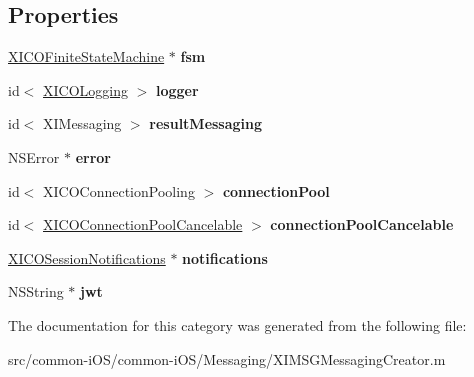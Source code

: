 \subsection*{Properties}
\begin{DoxyCompactItemize}
\item 
\hypertarget{category_x_i_m_s_g_messaging_creator_07_08_a4822405109783f0e28932d21c18ee185}{}\label{category_x_i_m_s_g_messaging_creator_07_08_a4822405109783f0e28932d21c18ee185} 
\hyperlink{class_x_i_c_o_finite_state_machine}{X\+I\+C\+O\+Finite\+State\+Machine} $\ast$ {\bfseries fsm}
\item 
\hypertarget{category_x_i_m_s_g_messaging_creator_07_08_a9dc70f2bf70103916fff0ee287ad2edd}{}\label{category_x_i_m_s_g_messaging_creator_07_08_a9dc70f2bf70103916fff0ee287ad2edd} 
id$<$ \hyperlink{protocol_x_i_c_o_logging-p}{X\+I\+C\+O\+Logging} $>$ {\bfseries logger}
\item 
\hypertarget{category_x_i_m_s_g_messaging_creator_07_08_ac73632d6f07601011cce1692beb5a6d1}{}\label{category_x_i_m_s_g_messaging_creator_07_08_ac73632d6f07601011cce1692beb5a6d1} 
id$<$ X\+I\+Messaging $>$ {\bfseries result\+Messaging}
\item 
\hypertarget{category_x_i_m_s_g_messaging_creator_07_08_a19e76d1c4090ab404813787accb19de1}{}\label{category_x_i_m_s_g_messaging_creator_07_08_a19e76d1c4090ab404813787accb19de1} 
N\+S\+Error $\ast$ {\bfseries error}
\item 
\hypertarget{category_x_i_m_s_g_messaging_creator_07_08_a0ae029b51a1b5fcadb40542837e79c5d}{}\label{category_x_i_m_s_g_messaging_creator_07_08_a0ae029b51a1b5fcadb40542837e79c5d} 
id$<$ X\+I\+C\+O\+Connection\+Pooling $>$ {\bfseries connection\+Pool}
\item 
\hypertarget{category_x_i_m_s_g_messaging_creator_07_08_a18ae4ba635bcbcc5de86fd710f126427}{}\label{category_x_i_m_s_g_messaging_creator_07_08_a18ae4ba635bcbcc5de86fd710f126427} 
id$<$ \hyperlink{interface_x_i_c_o_connection_pool_cancelable}{X\+I\+C\+O\+Connection\+Pool\+Cancelable} $>$ {\bfseries connection\+Pool\+Cancelable}
\item 
\hypertarget{category_x_i_m_s_g_messaging_creator_07_08_ae0e1e87a9c5141486be4e8fe70736518}{}\label{category_x_i_m_s_g_messaging_creator_07_08_ae0e1e87a9c5141486be4e8fe70736518} 
\hyperlink{interface_x_i_c_o_session_notifications}{X\+I\+C\+O\+Session\+Notifications} $\ast$ {\bfseries notifications}
\item 
\hypertarget{category_x_i_m_s_g_messaging_creator_07_08_aa4c3f7874d45fb2a7461923e99cd22e2}{}\label{category_x_i_m_s_g_messaging_creator_07_08_aa4c3f7874d45fb2a7461923e99cd22e2} 
N\+S\+String $\ast$ {\bfseries jwt}
\end{DoxyCompactItemize}


The documentation for this category was generated from the following file\+:\begin{DoxyCompactItemize}
\item 
src/common-\/i\+O\+S/common-\/i\+O\+S/\+Messaging/X\+I\+M\+S\+G\+Messaging\+Creator.\+m\end{DoxyCompactItemize}
